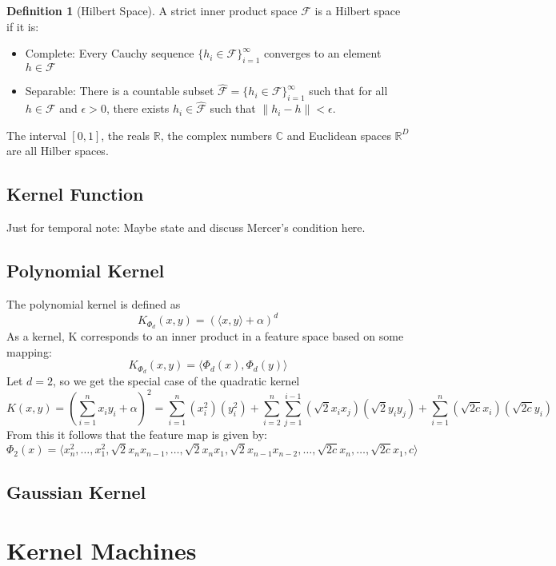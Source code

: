 \documentclass[12pt]{article}
\theoremstyle{definition}
\newtheorem{definition}{Definition}[section]
\theoremstyle{remark}
\begin{document}
\begin{definition}[Hilbert Space]
  A strict inner product space \(\mathcal{F}\) is a Hilbert space if it is:
  \begin{itemize}
    \item Complete: Every Cauchy sequence \(\{ h_i \in \mathcal{F} \}_{i=1}^\infty\) converges to an element \(h \in \mathcal{F}\)
    \item Separable: There is a countable subset \( \mathcal{\hat{F}} = \{ h_i \in \mathcal{F} \}_{i=1}^\infty \) such that for all \(h \in \mathcal{F}\) and \(\epsilon > 0 \), there exists \(h_i \in \mathcal{\hat{F}}\) such that \(\| h_i - h\| < \epsilon\).
  \end{itemize}
\end{definition}

The interval \([0, 1]\), the reals \(\mathbb{R}\), the complex numbers \(\mathbb{C}\) and Euclidean spaces \(\mathbb{R}^D\) are all Hilber spaces.
\subsection{Kernel Function}
Just for temporal note: Maybe state and discuss Mercer's condition here.
\subsection{Polynomial Kernel}
The polynomial kernel is defined as
\[
  K_{\Phi_{d}}(x, y) = {(\langle x,y \rangle + \alpha)}^{d}
\]
As a kernel, K corresponds to an inner product in a feature space based on some mapping:
\[
  K_{\Phi_{d}}(x, y) = \langle \Phi_{d}(x), \Phi_{d}(y) \rangle
\]
Let \( d=2 \), so we get the special case of the quadratic kernel
\[
  K(x, y) = (\sum_{i=1}^{n} x_{i}y_{i} + \alpha)^{2} = \sum_{i=1}^{n}(x_{i}^{2})(y_{i}^{2}) + \sum_{i=2}^{n}\sum_{j=1}^{i-1}(\sqrt{2}x_{i}x_{j})(\sqrt{2}y_{i}y_{j}) + \sum_{i=1}^{n}(\sqrt{2c}x_{i})(\sqrt{2c}y_{i})
\]
From this it follows that the feature map is given by:
\[
\Phi_{2}(x) = \langle x_{n}^{2},\dots,x_{1}^{2},\sqrt{2}x_{n}x_{n-1},\dots,\sqrt{2}x_{n}x_{1},\sqrt{2}x_{n-1}x_{n-2},\dots,\sqrt{2c}x_{n},\dots,\sqrt{2c}x_{1},c \rangle
\]


\subsection{Gaussian Kernel}

\section{Kernel Machines}
\end{document}
